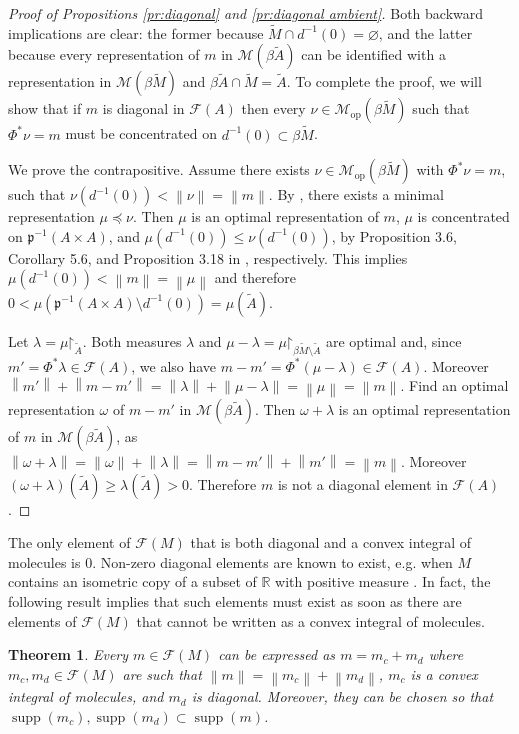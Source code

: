 \documentclass[a4paper,10pt]{amsart}
\DeclareMathOperator{\supp}{supp}                           %
\newcommand{\RR}{\mathbb{R}}                                %
\newcommand{\norm}[1]{\left\|{#1}\right\|}                  %
\newcommand{\restrict}{\mathord{\upharpoonright}}           %
\newcommand{\lipfree}[1]{\mathcal{F}({#1})}                 %
\newcommand{\meas}[1]{\mathcal{M}({#1})}                    %
\newcommand{\wt}[1]{\widetilde{#1}}                         %
\newcommand{\bwt}[1]{\beta\wt{#1}}                          %
\newcommand{\pp}{\mathfrak{p}}                              %
\newcommand{\opr}[1]{\mathcal{M}_{\mathrm{op}}(#1)}         %
\renewcommand{\leq}{\leqslant}
\renewcommand{\geq}{\geqslant}
\theoremstyle{plain}
\newtheorem{theorem}{Theorem}[section]
\theoremstyle{definition}
\theoremstyle{remark}
\begin{document}
\begin{proof}[Proof of Propositions \ref{pr:diagonal} and \ref{pr:diagonal ambient}]
Both backward implications are clear: the former because $\wt{M}\cap d^{-1}(0)=\varnothing$, and the latter because every representation of $m$ in $\meas{\bwt{A}}$ can be identified with a representation in $\meas{\bwt{M}}$ and $\bwt{A}\cap\wt{M}=\wt{A}$. To complete the proof, we will show that if $m$ is diagonal in $\lipfree{A}$ then every $\nu\in\opr{\bwt{M}}$ such that $\Phi^*\nu=m$ must be concentrated on $d^{-1}(0) \subset\bwt{M}$.

We prove the contrapositive. Assume there exists $\nu\in\opr{\bwt{M}}$ with $\Phi^*\nu=m$, such that $\nu(d^{-1}(0))<\norm{\nu}=\norm{m}$. By \cite[Proposition 3.10]{Smith24}, there exists a minimal representation $\mu\preccurlyeq\nu$. Then $\mu$ is an optimal representation of $m$, $\mu$ is concentrated on $\pp^{-1}(A\times A)$, and $\mu(d^{-1}(0))\leq\nu(d^{-1}(0))$, by Proposition 3.6, Corollary 5.6, and Proposition 3.18 in \cite{Smith24}, respectively. This implies $\mu(d^{-1}(0)) < \norm{m} = \norm{\mu}$ and therefore $0 < \mu(\pp^{-1}(A\times A)\setminus d^{-1}(0)) = \mu(\wt{A})$.

Let $\lambda=\mu\restrict_{\wt{A}}$. Both measures $\lambda$ and $\mu-\lambda=\mu\restrict_{\bwt{M}\setminus\wt{A}}$ are optimal and, since $m'=\Phi^*\lambda\in\lipfree{A}$, we also have $m-m'=\Phi^*(\mu-\lambda)\in\lipfree{A}$. Moreover $\norm{m'}+\norm{m-m'}=\norm{\lambda}+\norm{\mu-\lambda}=\norm{\mu}=\norm{m}$. Find an optimal representation $\omega$ of $m-m'$ in $\meas{\bwt{A}}$. Then $\omega+\lambda$ is an optimal representation of $m$ in $\meas{\bwt{A}}$, as $\norm{\omega+\lambda}=\norm{\omega}+\norm{\lambda}=\norm{m-m'}+\norm{m'}=\norm{m}$. Moreover $(\omega+\lambda)(\wt{A})\geq\lambda(\wt{A})>0$. Therefore $m$ is not a diagonal element in $\lipfree{A}$.
\end{proof}


The only element of $\lipfree{M}$ that is both diagonal and a convex integral of molecules is $0$. Non-zero diagonal elements are known to exist, e.g. when $M$ contains an isometric copy of a subset of $\RR$ with positive measure \cite[Theorem 4.1]{APS1}. In fact, the following result implies that such elements must exist as soon as there are elements of $\lipfree{M}$ that cannot be written as a convex integral of molecules.

\begin{theorem}\label{th:diagonal decomposition}
Every $m\in\lipfree{M}$ can be expressed as $m=m_c+m_d$ where $m_c,m_d\in\lipfree{M}$ are such that $\norm{m}=\norm{m_c}+\norm{m_d}$, $m_c$ is a convex integral of molecules, and $m_d$ is diagonal. Moreover, they can be chosen so that $\supp(m_c),\supp(m_d)\subset\supp(m)$.
\end{theorem}
\end{document}
